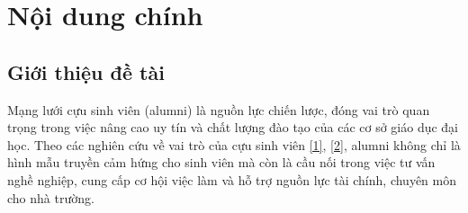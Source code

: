 \documentclass[12pt,a4paper]{article}
\begin{document}
\pagestyle{fancy}
\fancyhf{}
\fancyfoot[C]{\thepage}
\renewcommand{\headrulewidth}{0pt}
\renewcommand{\footrulewidth}{0pt}

\section{Nội dung chính}
\vspace{-6pt}

\subsection{Giới thiệu đề tài}
\vspace{-4pt}
Mạng lưới cựu sinh viên (alumni) là nguồn lực chiến lược, đóng vai trò quan trọng trong việc nâng cao uy tín và chất lượng đào tạo của các cơ sở giáo dục đại học. Theo các nghiên cứu về vai trò của cựu sinh viên \hyperref[ref:obeng]{[1]}, \hyperref[ref:unisel]{[2]}, alumni không chỉ là hình mẫu truyền cảm hứng cho sinh viên mà còn là cầu nối trong việc tư vấn nghề nghiệp, cung cấp cơ hội việc làm và hỗ trợ nguồn lực tài chính, chuyên môn cho nhà trường.
\end{document}
